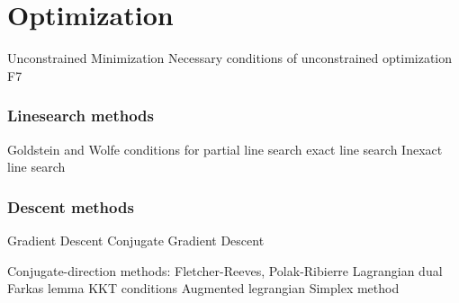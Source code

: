 \part{Optimization}

	Unconstrained Minimization
	Necessary conditions of unconstrained optimization F7

\section{Linesearch methods}
	Goldstein and Wolfe conditions for partial line search
	exact line search
	Inexact line search

\section{Descent methods}
	Gradient Descent
	Conjugate Gradient Descent



Conjugate-direction methods: Fletcher-Reeves, Polak-Ribierre
Lagrangian dual
Farkas lemma
KKT conditions
Augmented legrangian
Simplex method
